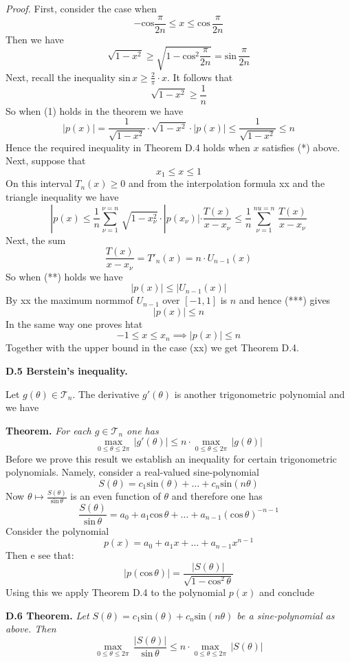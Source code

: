 \documentclass{amsart}
\begin{document}
{\noindent
\emph{Proof.}
First, consider the case when 
\[
-\text{cos}\frac{\pi}{2n}\leq
x\leq \text{cos}\,\frac{\pi}{2n}\tag{*}
\]
Then we have
\[
\sqrt{1-x^2}\geq 
\sqrt{1-\text{cos}^2\frac{\pi}{2n}}=
\text{sin}\,\frac{\pi}{2n}
\]
Next,  recall the inequality
$\text{sin}\, x\geq \frac{2}{\pi}\cdot x$.
It follows that
\[
\sqrt{1-x^2}\geq \frac{1}{n}
\]
So when (1) holds in the theorem we have
\[ 
|p(x)|=\frac{1}{\sqrt{1-x^2}}\cdot
\sqrt{1-x^2}\cdot |p(x)|\leq
\frac{1}{\sqrt{1-x^2}}\leq n
\]
Hence the required inequality in Theorem D.4  holds when
$x$ satisfies (*) above.
Next, suppose that
\[
x_1\leq x\leq 1\tag{**}
\]
On this interval $T_n(x)\geq 0$ and from the interpolation formula
xx and the triangle  inequality we have
\[
|p(x)\leq\frac{1}{n}
\sum_{\nu=1}^{\nu=n}\,
\sqrt{1-x_\nu^2}\cdot |p(x_\nu)|\cdot
\frac{T(x)}{x-x_\nu}\leq\frac{1}{n}
\sum_{\nu=1}^{nu=n}\,
\frac{T(x)}{x-x_\nu}
\]
Next, the sum
\[
\frac{T(x)}{x-x_\nu}=T'_n(x)=n\cdot U_{n-1}(x)
\]
So when (**) holds we have
\[
|p(x)|\leq |U_{n-1}(x)|\tag{***}
\]
By xx the maximum normmof $U_{n-1}$ over $[-1,1]$ is $n$ and hence
(***) gives
\[
 |p(x)|\leq n
\]
In the same way one proves htat
\[
-1\leq x\leq x_n\implies 
 |p(x)|\leq n
\] 
Together with the upper bound in the case (xx) we get Theorem D.4.

\bigskip

\centerline{\bf{D.5 Berstein's inequality.}}
\medskip

\noindent 
Let $g(\theta)\in\mathcal T_n$.
The derivative $g'(\theta)$ is another trigonometric polynomial and we have
\medskip

\noindent
{\bf Theorem.} \emph{For each $g\in\mathcal T_n$ one has}
\[
\max_{0\leq \theta\leq 2\pi}\,
|g'(\theta)|\leq n\cdot 
\max_{0\leq \theta\leq 2\pi}\,|g(\theta)|
\]
\medskip
\noindent
Before we prove this result
we establish an inequality for certain trigonometric polynomials.
Namely, consider a real-valued sine-polynomial
\[
S(\theta)= 
c_1\text{sin}(\theta)+ \ldots+
c_n\text{sin}(n\theta)
\]
Now $\theta\mapsto \frac{ S(\theta)}{\text{sin}\,\theta}$
is an even function of $\theta$ and therefore
one has
\[
\frac{ S(\theta)}{\text{sin}\,\theta}= 
a_0+a_1\text{cos}\,\theta+
\ldots+a_{n-1}(\text{cos}\,\theta)^{-n-1}
\]
Consider the polynomial
\[
p(x)= a_0+a_1x+\ldots+a_{n-1}x^{n-1}
\]
Then e see that:
\[
|p(\text{cos}\,\theta)|=
\frac{|S(\theta)|}{\sqrt{1-\text{cos}^2\,\theta}}
\]
Using this we apply Theorem D.4 to the polynomial $p(x)$ and conclude
\medskip

\noindent
{\bf{D.6 Theorem.}}
\emph{Let $S(\theta)= 
c_1\text{sin}(\theta)+ 
c_n\text{sin}(n\theta)$ be a sine-polynomial as above.
Then}
\[
\max_{0\leq\theta\leq 2\pi}\,
\frac{|S(\theta)|}{\text{sin}\,\theta}\leq n\cdot
\max_{0\leq\theta\leq 2\pi}\,
|S(\theta)|
\]
\bigskip

}
\end{document}
